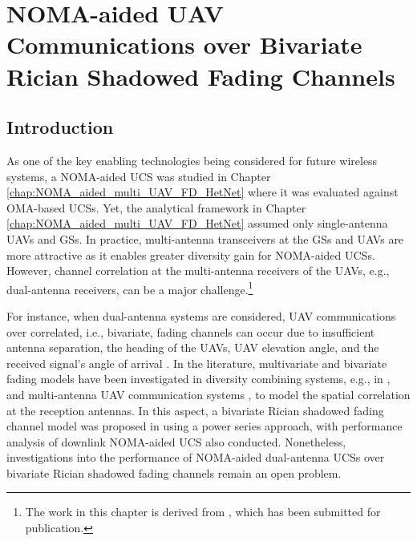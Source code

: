 \chapter{NOMA-aided UAV Communications over Bivariate Rician Shadowed Fading Channels}
\label{chap:NOMA_bivariate_Rician_Shadowed}
\section{Introduction}

As one of the key enabling technologies being considered for future wireless systems, a NOMA-aided UCS was studied in Chapter \ref{chap:NOMA_aided_multi_UAV_FD_HetNet} where it was evaluated against OMA-based UCSs. Yet, the analytical framework in Chapter \ref{chap:NOMA_aided_multi_UAV_FD_HetNet} assumed only single-antenna UAVs and GSs. In practice, multi-antenna transceivers at the GSs and UAVs are more attractive as it enables greater diversity gain for NOMA-aided UCSs. However, channel correlation at the multi-antenna receivers of the UAVs, e.g., dual-antenna receivers, can be a major challenge.\footnote{The work in this chapter is derived from \cite{ernest2019correlated}, which has been submitted for publication.}

For instance, when dual-antenna systems are considered, UAV communications over correlated, i.e., bivariate, fading channels can occur due to insufficient antenna separation, the heading of the UAVs, UAV elevation angle, and the received signal's angle of arrival \cite{tan2019downlink,jiang2010dynamic,jin2017three,jiang2012optimization}. In the literature, multivariate and bivariate fading models have been investigated in diversity combining systems, e.g., in \cite{beaulieu2011novel,beaulieu2011novelsimple,lopez2018bivariate}, and multi-antenna UAV communication systems \cite{zhan2011wireless,jiang2010dynamic,jin2017three,jiang2012optimization}, to model the spatial correlation at the reception antennas. In this aspect, a bivariate Rician shadowed fading channel model was proposed in \cite{tan2019downlink} using a power series approach, with performance analysis of downlink NOMA-aided UCS also conducted. Nonetheless, investigations into the performance of NOMA-aided dual-antenna UCSs over bivariate Rician shadowed fading channels remain an open problem.

